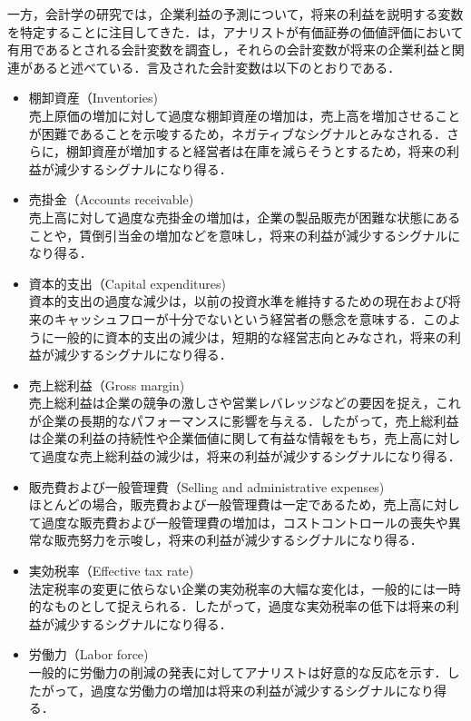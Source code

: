 \documentclass[a4paper，11pt]{jsarticle}
\begin{document}
一方，会計学の研究では，企業利益の予測について，将来の利益を説明する変数を特定することに注目してきた．\cite*{lev1993fundamental}は，アナリストが有価証券の価値評価において有用であるとされる会計変数を調査し，それらの会計変数が将来の企業利益と関連があると述べている．言及された会計変数は以下のとおりである．

\begin{itemize}
\item 棚卸資産（Inventories)\\
    売上原価の増加に対して過度な棚卸資産の増加は，売上高を増加させることが困難であることを示唆するため，ネガティブなシグナルとみなされる．さらに，棚卸資産が増加すると経営者は在庫を減らそうとするため，将来の利益が減少するシグナルになり得る．

\item 売掛金（Accounts receivable)\\
    売上高に対して過度な売掛金の増加は，企業の製品販売が困難な状態にあることや，賃倒引当金の増加などを意味し，将来の利益が減少するシグナルになり得る．

\item 資本的支出（Capital expenditures)\\
    資本的支出の過度な減少は，以前の投資水準を維持するための現在および将来のキャッシュフローが十分でないという経営者の懸念を意味する．このように一般的に資本的支出の減少は，短期的な経営志向とみなされ，将来の利益が減少するシグナルになり得る．

\item 売上総利益（Gross margin)\\
    売上総利益は企業の競争の激しさや営業レバレッジなどの要因を捉え，これが企業の長期的なパフォーマンスに影響を与える．したがって，売上総利益は企業の利益の持続性や企業価値に関して有益な情報をもち，売上高に対して過度な売上総利益の減少は，将来の利益が減少するシグナルになり得る．

\item 販売費および一般管理費（Selling and administrative expenses)\\
    ほとんどの場合，販売費および一般管理費は一定であるため，売上高に対して過度な販売費および一般管理費の増加は，コストコントロールの喪失や異常な販売努力を示唆し，将来の利益が減少するシグナルになり得る．

\item 実効税率（Effective tax rate)\\
    法定税率の変更に依らない企業の実効税率の大幅な変化は，一般的には一時的なものとして捉えられる．したがって，過度な実効税率の低下は将来の利益が減少するシグナルになり得る．

\item 労働力（Labor force)\\
    一般的に労働力の削減の発表に対してアナリストは好意的な反応を示す．したがって，過度な労働力の増加は将来の利益が減少するシグナルになり得る．
\end{itemize}
\end{document}
